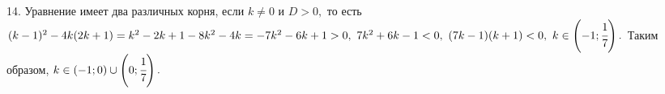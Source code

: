 14. Уравнение имеет два различных корня, если $k\neq0$ и $D>0,$ то есть $(k-1)^2-4k(2k+1)=k^2-2k+1-8k^2-4k=-7k^2-6k+1>0,\ 7k^2+6k-1<0,\ (7k-1)(k+1)<0,\ k\in\left(-1;\cfrac{1}{7}\right).$ Таким образом, $k\in\left(-1;0\right)\cup\left(0;\cfrac{1}{7}\right).$\\
